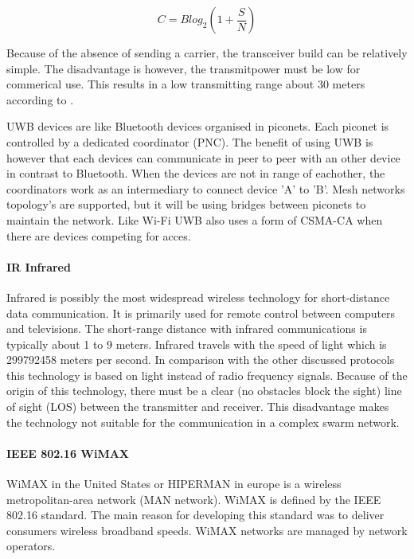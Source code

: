 \documentclass[10pt,a4paper]{article}
\begin{document}
 \begin{equation}
    C=Blog_2(1+\frac{S}{N})
    \label{eq:channelcapacity}
 \end{equation}

 Because of the absence of sending a carrier, the transceiver build can be relatively simple. \cite{ultrawidebandwirelesscommunications} The disadvantage is however, the transmitpower must be low for commerical use. This results in a low transmitting range about 30 meters according to \cite{combook}.

UWB devices are like Bluetooth devices organised in piconets. Each piconet is controlled by a dedicated coordinator (PNC). The benefit of using UWB is however that each devices can communicate in peer to peer with an other device in contrast to Bluetooth. When the devices are not in range of eachother, the coordinators work as an intermediary to connect device 'A' to 'B'. Mesh networks topology's are supported, but it will be using bridges between piconets to maintain the network. Like Wi-Fi UWB also uses a form of CSMA-CA when there are devices competing for acces. \cite{piconetinterconnectionstrategies}

\paragraph{IR Infrared}
Infrared is possibly the most widespread wireless technology for short-distance data communication. \cite{combook} It is primarily used for remote control between computers and televisions. The short-range distance with infrared communications is typically about 1 to 9 meters. \cite{combook} Infrared travels with the speed of light which is 299792458 meters per second. \cite{speedoflight} In comparison with the other discussed protocols this technology is based on light instead of radio frequency signals. Because of the origin of this technology, there must be a clear (no obstacles block the sight) line of sight (LOS) between the transmitter and receiver. This disadvantage makes the technology not suitable for the communication in a complex swarm network.\\

\paragraph{IEEE 802.16 WiMAX}
WiMAX in the United States or HIPERMAN in europe is a wireless metropolitan-area network (MAN network). \cite{draadlozecommunicatie} WiMAX is defined by the IEEE 802.16 standard. The main reason for developing this standard was to deliver consumers wireless broadband speeds. WiMAX networks are managed by network operators.
\end{document}
